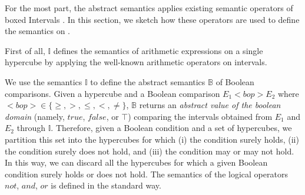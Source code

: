 For the most part, the abstract semantics applies existing semantic operators of boxed Intervals \cite{COU98}. In this section, we sketch how these operators are used to define the semantics on \adomain.

First of all, $\mathbb{I}$ defines the semantics of arithmetic expressions on a single hypercube by applying the well-known arithmetic operators on intervals. 

We use the semantics $\mathbb{I}$ to define the abstract semantics $\mathbb{B}$ of Boolean comparisons. Given a hypercube and a Boolean comparison $E_1 <bop> E_2$ where $<bop> \in \{\geq, >, \leq, <, \neq \}$, $\mathbb{B}$ returns an \emph{abstract value of the boolean domain} (namely, $\mathit{true}$, $\mathit{false}$, or $\top$) comparing the intervals obtained from $E_1$ and $E_2$ through $\mathbb{I}$. Therefore, given a Boolean condition and a set of hypercubes, we partition this set into the hypercubes for which (i) the condition surely holds, (ii) the condition surely does not hold, and (iii) the condition may or may not hold. In this way, we can discard all the hypercubes for which a given Boolean condition surely holds or does not hold.
The semantics of the logical operators $not$, $and$, $or$ is defined in the standard way.

